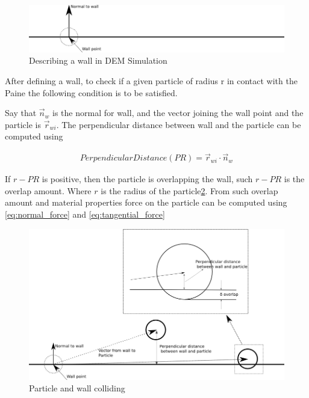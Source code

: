 \begin{figure}
  \centering
  \includegraphics[scale=2.]{dem/doc_images/wall_description}
  \caption{Describing a wall in DEM Simulation}
  \label{fig:wall_description}
\end{figure}


After defining a wall, to check if a given particle of radius r in
contact with the Paine the following condition is to be satisfied.

Say that $\vec{n}_w$ is the normal for wall, and the vector joining
the wall point and the particle is $\vec{r}_{wi}$. The perpendicular
distance between wall and the particle can be computed using

\begin{align}
  \label{eq:perpendicular_dist}
    Perpendicular Distance(PR) =  \vec{r}_{wi} \cdot  \vec{n}_w
\end{align}

If $r - PR $ is positive, then the particle is overlapping the wall,
such $r - PR$ is the overlap amount. Where $r$ is the radius of the
particle\ref{fig:particle_wall_collision}. From such overlap amount
and material properties force on the particle can be computed using
\eqref{eq:normal_force} and \eqref{eq:tangential_force}

\begin{figure}
  \centering
  \includegraphics[scale=1.5]{dem/doc_images/particle_wall_collision.png}
  \caption{Particle and wall colliding}
  \label{fig:particle_wall_collision}
\end{figure}




